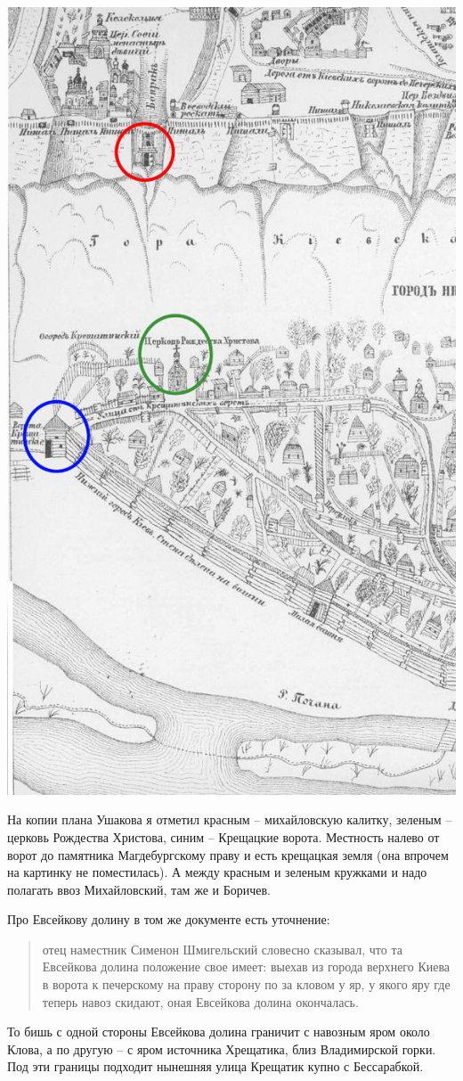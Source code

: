 \begin{center}
\includegraphics[width=0.60\linewidth]{chast-colebanie-osnov/pochayna/1695-kr.jpg}
\end{center}

На копии плана Ушакова я отметил красным – михайловскую калитку, зеленым – церковь Рождества Христова, синим – Крещацкие ворота. Местность налево от ворот до памятника Магдебургскому праву и есть крещацкая земля (она впрочем на картинку не поместилась). А между красным и зеленым кружками и надо полагать ввоз Михайловский, там же и Боричев.

Про Евсейкову долину в том же документе есть уточнение:

\begin{quotation}
отец наместник Сименон Шмигельский словесно сказывал, что та Евсейкова долина положение свое имеет: выехав из города верхнего Киева в ворота к печерскому на праву сторону по за кловом у яр, у якого яру где теперь навоз скидают, оная Евсейкова долина окончалась.
\end{quotation}

То бишь с одной стороны Евсейкова долина граничит с навозным яром около Клова, а по другую – с яром источника Хрещатика, близ Владимирской горки. Под эти границы подходит нынешняя улица Крещатик купно с Бессарабкой.


